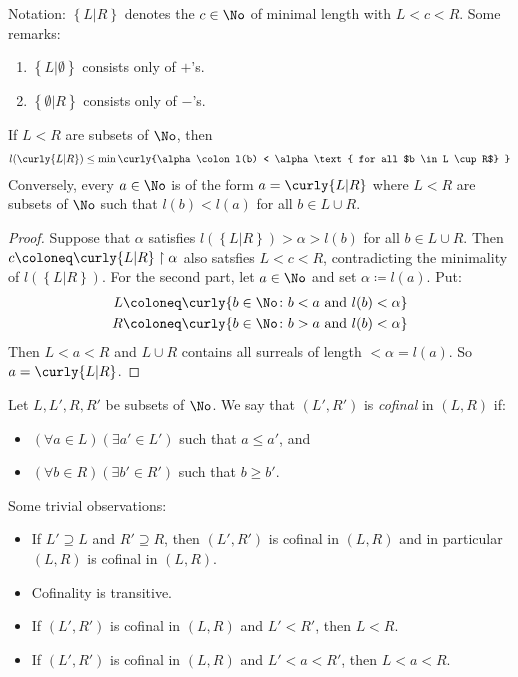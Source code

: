 Notation: $\left\{ L \vert R \right\}$ denotes the $c \in \No$
of minimal length with $L < c < R$. Some remarks: 
\begin{enumerate}[(1)]
	\item $\left\{ L \vert \emptyset \right\}$ consists only of 
		$+$'s. 
	\item $\left\{ \emptyset \vert R \right\}$ consists only of 
		$-$'s. 
\end{enumerate}
\begin{lem}
	If $L < R$ are subsets of $\No$, then 
	\begin{align*}
		l( \curly{L \vert R}) \leq 
		\min{ \curly{\alpha \colon l(b) < \alpha \text{ for all 
		$b \in L \cup R$} }}
	\end{align*}
	Conversely, every $a \in \No$ is of the form 
	$a = \curly{L \vert R}$ where $L < R$ are subsets of 
	$\No$ such that $l(b) < l(a)$ for all $b \in L \cup R$. 
	\label{lemma_on_length_of_cuts}
\end{lem}
\begin{proof}
	Suppose that $\alpha$ satisfies $l(\left\{ L \vert R \right\}) > 
	\alpha > l(b)$ for all $b \in L \cup R$. Then 
	$c \coloneq \curly{L \vert R} \restriction \alpha$ also 
	satsfies $L < c < R$, contradicting the minimality of 
	$l(\left\{ L \vert R \right\})$. For the second part, let 
	$a \in \No$ and set $\alpha \coloneq l(a)$. Put: 
	\begin{align*}
		L &\coloneq \curly{b \in \No \colon b < a 
			\text{ and } l(b) < \alpha} \\
			R &\coloneq \curly{b \in \No \colon 
				b > a \text{ and } l(b) < \alpha}
	\end{align*}
	Then $L < a < R$ and $L \cup R$ contains all surreals of 
	length $< \alpha = l(a)$. So $a = \curly{L \vert R}$. 
\end{proof}
\begin{defn}
	Let $L, L', R, R'$ be subsets of $\No$. We say that 
	$(L', R')$ is \emph{cofinal} in $(L, R)$ if: 
	\begin{itemize}
		\item $(\forall a \in L)(\exists a' \in L')$ 
		such that $a \leq a'$, and 
		\item $(\forall b \in R)(\exists b' \in R')$
		such that $b \geq b'$.
	\end{itemize}
\end{defn}
Some trivial observations: 
\begin{itemize}
	\item If $L' \supseteq L$ and $R' \supseteq R$, then 
		$(L', R')$ is cofinal in $(L, R)$ and in 
		particular $(L, R)$ is cofinal in $(L, R)$. 
	\item Cofinality is transitive. 
	\item If $(L', R')$ is cofinal in $(L, R)$ and 
		$L' < R'$, then $L < R$. 
	\item If $(L', R')$ is cofinal in $(L, R)$ and 
		$L' < a < R'$, then $L < a < R$. 
\end{itemize}
